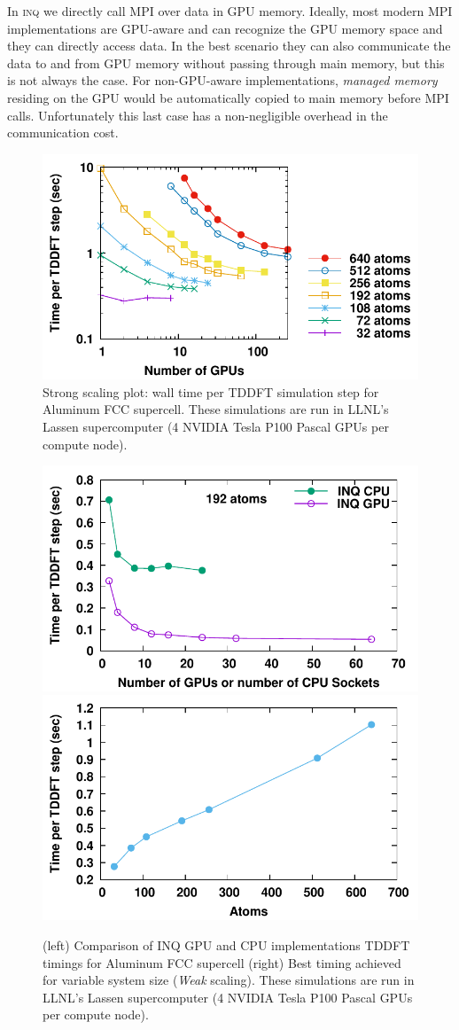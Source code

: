 In \textsc{inq} we directly call \textsc{MPI} over data in GPU memory.
Ideally, most modern \textsc{MPI} implementations are GPU-aware and can recognize the GPU memory space and they can directly access data.
In the best scenario they can also communicate the data to and from GPU memory without passing through main memory, but this is not always the case.
For non-GPU-aware implementations, \emph{managed memory} residing on the GPU would be automatically copied to main memory before \textsc{MPI} calls.
Unfortunately this last case has a non-negligible overhead in the communication cost.

\begin{figure}[h]
	\centering
	\includegraphics[width=0.66\linewidth]{figures/scaling/strong}
	\caption{
		Strong scaling plot: wall time per TDDFT simulation step for Aluminum FCC supercell.
		These simulations are run in LLNL's Lassen supercomputer (4 NVIDIA Tesla P100 Pascal GPUs per compute node).
	}
	\label{fig:scaling_strong}
\end{figure}

\begin{figure}[h]
	\centering
	\includegraphics[width=0.45\linewidth]{figures/scaling/gpu_vs_cpu}
	\includegraphics[width=0.45\linewidth]{figures/scaling/weak}
	\caption{
		(left)  Comparison of INQ GPU and CPU implementations TDDFT timings for Aluminum FCC supercell
		(right) Best timing achieved for variable system size (\emph{Weak} scaling).
		These simulations are run in LLNL's Lassen supercomputer (4 NVIDIA Tesla P100 Pascal GPUs per compute node).
	}
	\label{fig:scaling_gpu_vs_cpu}
	\label{fig:scaling_weak}
\end{figure}

